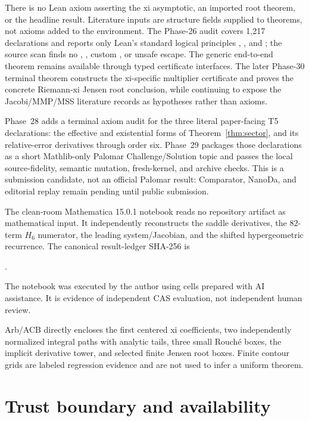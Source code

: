 \documentclass[12pt]{article}
\begin{document}
There is no Lean axiom asserting the xi asymptotic, an imported root theorem,
or the headline result.  Literature inputs are structure fields supplied to
theorems, not axioms added to the environment.  The Phase-26 audit covers
1,217 declarations and reports only Lean's standard logical principles
, , and ; the source
scan finds no , , custom , or unsafe
escape.  The generic end-to-end theorem remains available through typed
certificate interfaces.  The later Phase-30 terminal theorem constructs the
xi-specific multiplier certificate and proves the concrete Riemann-xi Jensen
root conclusion, while continuing to expose the Jacobi/MMP/MSS literature
records as hypotheses rather than axioms.

Phase~28 adds a terminal axiom audit for the three literal paper-facing T5
declarations: the effective and existential forms of
Theorem~\ref{thm:sector}, and its relative-error derivatives through order
six.  Phase~29 packages those declarations as a short Mathlib-only Palomar
Challenge/Solution topic and passes the local source-fidelity, semantic
mutation, fresh-kernel, and archive checks.  This is a submission candidate,
not an official Palomar result: Comparator, NanoDa, and editorial replay
remain pending until public submission.

The clean-room Mathematica 15.0.1 notebook reads no repository artifact as
mathematical input.  It independently reconstructs the saddle derivatives,
the $82$-term $H_6$ numerator, the leading system/Jacobian, and the shifted
hypergeometric recurrence.  The canonical result-ledger SHA-256 is
\begin{center}
.
\end{center}
The notebook was executed by the author using cells prepared with AI
assistance.  It is evidence of independent CAS evaluation, not independent
human review.

Arb/ACB directly encloses the first centered xi coefficients, two
independently normalized integral paths with analytic tails, three small
Rouch\'e boxes, the implicit derivative tower, and selected finite Jensen
root boxes.  Finite contour grids are labeled regression evidence and are
not used to infer a uniform theorem.

\section{Trust boundary and availability}\label{sec:trust}
\end{document}
